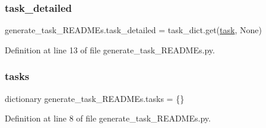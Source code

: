 \subsubsection{\texorpdfstring{task\+\_\+detailed}{task\_detailed}}
{\footnotesize\ttfamily generate\+\_\+task\+\_\+\+R\+E\+A\+D\+M\+Es.\+task\+\_\+detailed = task\+\_\+dict.\+get(\textquotesingle{}\hyperlink{namespacegenerate__task__READMEs_a1cd96208f46b10658c7fda64585ee590}{task}\textquotesingle{}, None)}



Definition at line 13 of file generate\+\_\+task\+\_\+\+R\+E\+A\+D\+M\+Es.\+py.

\mbox{\label{namespacegenerate__task__READMEs_a8f4da8ba04584af52e0e9e2f209245c2}} 
\subsubsection{\texorpdfstring{tasks}{tasks}}
{\footnotesize\ttfamily dictionary generate\+\_\+task\+\_\+\+R\+E\+A\+D\+M\+Es.\+tasks = \{\}}



Definition at line 8 of file generate\+\_\+task\+\_\+\+R\+E\+A\+D\+M\+Es.\+py.

